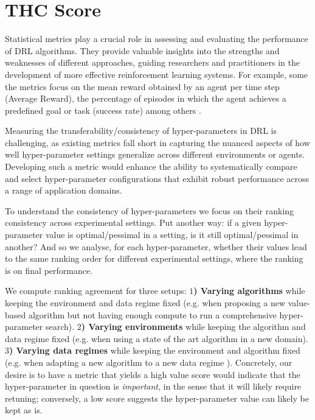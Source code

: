 \documentclass[10pt]{article} %
\begin{document}
\section{THC Score}
\label{sec:thc_metric}

Statistical metrics play a crucial role in assessing and evaluating the performance of DRL algorithms. 
They provide valuable insights into the strengths and weaknesses of different approaches, guiding researchers and practitioners in the development of more effective reinforcement learning systems.
For example, some the metrics focus on the mean reward obtained by an agent per time step (Average Reward), the percentage of episodes in which the agent achieves a predefined goal or task (success rate) among others \citep{agarwal2021deep, chan2020measuring, Henderson2017DeepRL}. 

Measuring the transferability/consistency of hyper-parameters in DRL is challenging, as existing metrics fall short in capturing the nuanced aspects of how well hyper-parameter settings generalize across different environments or agents. Developing such a metric would enhance the ability to systematically compare and select hyper-parameter configurations that exhibit robust performance across a range of application domains.

To understand the consistency of hyper-parameters we focus on their ranking consistency across experimental settings. Put another way: if a given hyper-parameter value is optimal/pessimal in a setting, is it still optimal/pessimal in another? And so we analyse, for each hyper-parameter, whether their values lead to the same ranking order for different experimental settings, where the ranking is on final performance. 

We compute ranking agreement for three setups: 
{\bf $1$) Varying algorithms} while keeping the environment and data regime fixed (e.g. when proposing a new value-based algorithm but not having enough compute to run a comprehensive hyper-parameter search). {\bf $2$) Varying environments} while keeping the algorithm and data regime fixed (e.g. when using a state of the art algorithm in a new domain).
{\bf $3$) Varying data regimes} while keeping the environment and algorithm fixed (e.g. when adapting a new algorithm to a new data regime \citep{hasselt19when}).
Concretely, our desire is to have a metric that yields a high value score would indicate that the hyper-parameter in question is {\em important}, in the sense that it will likely require retuning; conversely, a low score suggests the hyper-parameter value can likely be kept as is.
\end{document}
